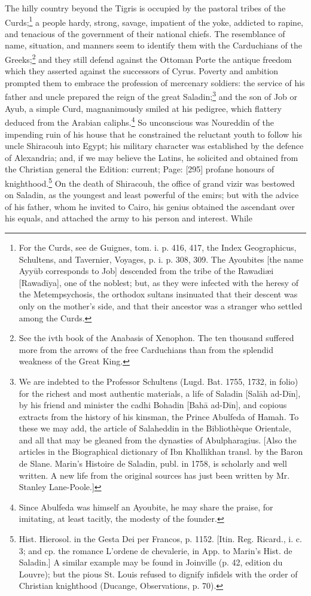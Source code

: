 The hilly country beyond the Tigris is occupied by the pastoral tribes of the Curds;\footnote{For the Curds, see de Guignes, tom. i. p. 416, 417, the Index Geographicus, Schultens, and Tavernier, Voyages, p. i. p. 308, 309. The Ayoubites [the name Ayyūb corresponds to Job] descended from the tribe of the Rawadiæi [Rawadīya], one of the noblest; but, as they were infected with the heresy of the Metempsychosis, the orthodox sultans insinuated that their descent was only on the mother\texthebrew{}’s side, and that their ancestor was a stranger who settled among the Curds.} a people hardy, strong, savage, impatient of the yoke, addicted to rapine, and tenacious of the government of their national chiefs. The resemblance of name, situation, and manners seem to identify them with the Carduchians of the Greeks;\footnote{See the ivth book of the Anabasis of Xenophon. The ten thousand suffered more from the arrows of the free Carduchians than from the splendid weakness of the Great King.} and they still defend against the Ottoman Porte the antique freedom which they asserted against the successors of Cyrus. Poverty and ambition prompted them to embrace the profession of mercenary soldiers: the service of his father and uncle prepared the reign of the great Saladin;\footnote{We are indebted to the Professor Schultens (Lugd. Bat. 1755, 1732, in folio) for the richest and most authentic materials, a life of Saladin [Salāh ad-Dīn], by his friend and minister the cadhi Bohadin [Bahā ad-Dīn], and copious extracts from the history of his kinsman, the Prince Abulfeda of Hamah. To these we may add, the article of Salaheddin in the Bibliothèque Orientale, and all that may be gleaned from the dynasties of Abulpharagius. [Also the articles in the Biographical dictionary of Ibn Khallikhan transl. by the Baron de Slane. Marin\texthebrew{}’s Histoire de Saladin, publ. in 1758, is scholarly and well written. A new life from the original sources has just been written by Mr. Stanley Lane-Poole.]} and the son of Job or Ayub, a simple Curd, magnanimously smiled at his pedigree, which flattery deduced from the Arabian caliphs.\footnote{Since Abulfeda was himself an Ayoubite, he may share the praise, for imitating, at least tacitly, the modesty of the founder.} So unconscious was Noureddin of the impending ruin of his house that he constrained the reluctant youth to follow his uncle Shiracouh into Egypt; his military character was established by the defence of Alexandria; and, if we may believe the Latins, he solicited and obtained from the Christian general the Edition: current; Page: [295] profane honours of knighthood.\footnote{Hist. Hierosol. in the Gesta Dei per Francos, p. 1152. [Itin. Reg. Ricard., i. c. 3; and cp. the romance L\texthebrew{}’ordene de chevalerie, in App. to Marin\texthebrew{}’s Hist. de Saladin.] A similar example may be found in Joinville (p. 42, edition du Louvre); but the pious St. Louis refused to dignify infidels with the order of Christian knighthood (Ducange, Observations, p. 70).} On the death of Shiracouh, the office of grand vizir was bestowed on Saladin, as the youngest and least powerful of the emirs; but with the advice of his father, whom he invited to Cairo, his genius obtained the ascendant over his equals, and attached the army to his person and interest. While 